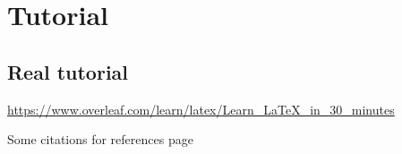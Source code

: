 \chapter{Tutorial}

\section{Real tutorial}

\url{https://www.overleaf.com/learn/latex/Learn_LaTeX_in_30_minutes}

Some \cite{md1} citations \cite{lammps} for references page \cite{residence-time} 
